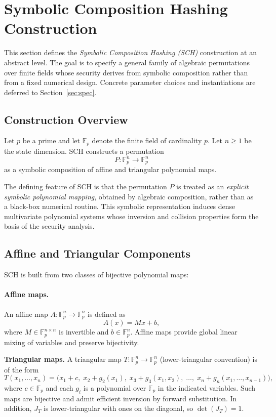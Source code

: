 ﻿\documentclass[english]{aucmcs}
\newcommand{\Fp}{\mathbb{F}_p}
\begin{document}
\section{Symbolic Composition Hashing Construction}
\label{sec:construction}

This section defines the \emph{Symbolic Composition Hashing (SCH)} construction at an abstract level.
The goal is to specify a general family of algebraic permutations over finite fields whose security
derives from symbolic composition rather than from a fixed numerical design.
Concrete parameter choices and instantiations are deferred to Section~\ref{sec:spec}.

\subsection{Construction Overview}

Let $p$ be a prime and let $\Fp$ denote the finite field of cardinality $p$.
Let $n \ge 1$ be the state dimension.
SCH constructs a permutation
\[
P : \Fp^n \longrightarrow \Fp^n
\]
as a symbolic composition of affine and triangular polynomial maps.

The defining feature of SCH is that the permutation $P$ is treated as an
\emph{explicit symbolic polynomial mapping}, obtained by algebraic composition,
rather than as a black-box numerical routine.
This symbolic representation induces dense multivariate polynomial systems whose
inversion and collision properties form the basis of the security analysis.

\subsection{Affine and Triangular Components}

SCH is built from two classes of bijective polynomial maps:

\paragraph{Affine maps.}
An affine map $A : \Fp^n \to \Fp^n$ is defined as
\[
A(x) = Mx + b,
\]
where $M \in \Fp^{n \times n}$ is invertible and $b \in \Fp^n$.
Affine maps provide global linear mixing of variables and preserve bijectivity.

\textbf{Triangular maps.} A triangular map $T : \Fp^n \to \Fp^n$ (lower-triangular
convention) is of the form
\[
T(x_1,\ldots,x_n)=
\bigl(
x_1+c,\;
x_2+g_2(x_1),\;
x_3+g_3(x_1,x_2),\;
\ldots,\;
x_n+g_n(x_1,\ldots,x_{n-1})
\bigr),
\]
where $c\in \Fp$ and each $g_i$ is a polynomial over $\Fp$ in the indicated
variables. Such maps are bijective and admit efficient inversion by forward
substitution. In addition, $J_T$ is lower-triangular with ones on the diagonal,
so $\det(J_T)=1$.
\end{document}
